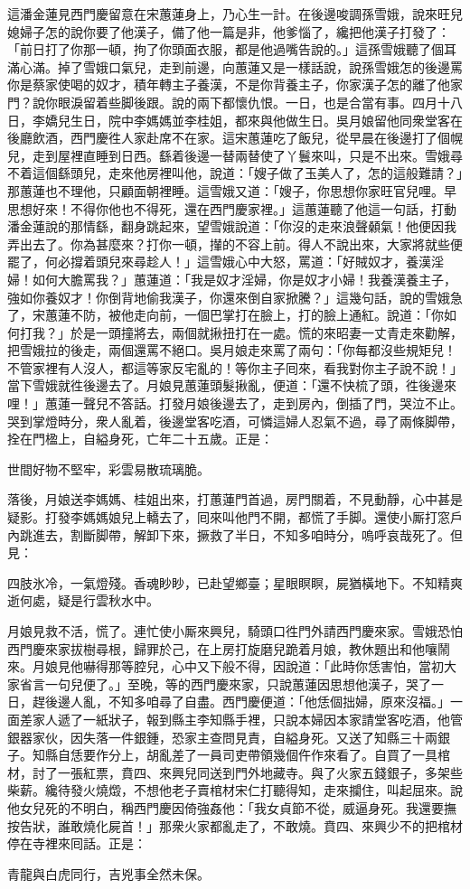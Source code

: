這潘金蓮見西門慶留意在宋蕙蓮身上，乃心生一計。在後邊唆調孫雪娥，說來旺兒媳婦子怎的說你要了他漢子，備了他一篇是非，他爹惱了，纔把他漢子打發了：「前日打了你那一頓，拘了你頭面衣服，都是他過嘴告說的。」這孫雪娥聽了個耳滿心滿。掉了雪娥口氣兒，走到前邊，向蕙蓮又是一樣話說，說孫雪娥怎的後邊罵你是蔡家使喝的奴才，積年轉主子養漢，不是你背養主子，你家漢子怎的離了他家門？說你眼淚留着些脚後跟。說的兩下都懷仇恨。一日，也是合當有事。四月十八日，李嬌兒生日，院中李媽媽並李桂姐，都來與他做生日。吳月娘留他同衆堂客在後廳飲酒，西門慶徃人家赴席不在家。這宋蕙蓮吃了飯兒，從早晨在後邊打了個幌兒，走到屋裡直睡到日西。繇着後邊一替兩替使了丫鬟來叫，只是不出來。雪娥尋不着這個繇頭兒，走來他房裡叫他，說道：「嫂子做了玉美人了，怎的這般難請？」那蕙蓮也不理他，只顧面朝裡睡。這雪娥又道：「嫂子，你思想你家旺官兒哩。早思想好來！不得你他也不得死，還在西門慶家裡。」{}這蕙蓮聽了他這一句話，打動潘金蓮說的那情繇，翻身跳起來，望雪娥說道：「你沒的走來浪聲顙氣！他便因我弄出去了。你為甚麼來？打你一頓，攆的不容上前。得人不說出來，大家將就些便罷了，何必撐着頭兒來尋趁人！」這雪娥心中大怒，罵道：「好賊奴才，養漢淫婦！如何大膽罵我？」蕙蓮道：「我是奴才淫婦，你是奴才小婦！我養漢養主子，強如你養奴才！{}你倒背地偷我漢子，你還來倒自家掀騰？」這幾句話，說的雪娥急了，宋蕙蓮不防，被他走向前，一個巴掌打在臉上，打的臉上通紅。說道：「你如何打我？」於是一頭撞將去，兩個就揪扭打在一處。慌的來昭妻一丈青走來勸解，把雪娥拉的後走，兩個還罵不絕口。吳月娘走來罵了兩句：「你每都沒些規矩兒！不管家裡有人沒人，都這等家反宅亂的！等你主子囘來，看我對你主子說不說！」當下雪娥就徃後邊去了。月娘見蕙蓮頭髮揪亂，便道：「還不快梳了頭，徃後邊來哩！」蕙蓮一聲兒不答話。打發月娘後邊去了，走到房內，倒插了門，哭泣不止。哭到掌燈時分，衆人亂着，後邊堂客吃酒，可憐這婦人忍氣不過，{}尋了兩條脚帶，拴在門楹上，自縊身死，亡年二十五歲。正是：

世間好物不堅牢，彩雲易散琉璃脆。

落後，月娘送李媽媽、桂姐出來，打蕙蓮門首過，房門關着，不見動靜，心中甚是疑影。打發李媽媽娘兒上轎去了，囘來叫他門不開，都慌了手脚。還使小厮打窓戶內跳進去，割斷脚帶，解卸下來，撅救了半日，不知多咱時分，嗚呼哀哉死了。但見：

四肢氷冷，一氣燈殘。香魂眇眇，已赴望鄉臺；星眼瞑瞑，屍猶橫地下。不知精爽逝何處，疑是行雲秋水中。

月娘見救不活，慌了。連忙使小厮來興兒，騎頭口徃門外請西門慶來家。雪娥恐怕西門慶來家拔樹尋根，歸罪於己，在上房打旋磨兒跪着月娘，教休題出和他嚷鬧來。月娘見他嚇得那等腔兒，心中又下般不得，因說道：「此時你恁害怕，當初大家省言一句兒便了。」至晚，等的西門慶來家，只說蕙蓮因思想他漢子，哭了一日，趕後邊人亂，不知多咱尋了自盡。西門慶便道：「他恁個拙婦，原來沒福。」{}一面差家人遞了一紙狀子，報到縣主李知縣手裡，只說本婦因本家請堂客吃酒，他管銀器家伙，因失落一件銀鍾，恐家主查問見責，自縊身死。又送了知縣三十兩銀子。知縣自恁要作分上，胡亂差了一員司吏帶領幾個仵作來看了。自買了一具棺材，討了一張紅票，賁四、來興兒同送到門外地藏寺。與了火家五錢銀子，多架些柴薪。纔待發火燒燬，不想他老子賣棺材宋仁打聽得知，走來攔住，叫起屈來。說他女兒死的不明白，稱西門慶因倚強姦他：「我女貞節不從，威逼身死。我還要撫按告狀，誰敢燒化屍首！」那衆火家都亂走了，不敢燒。賁四、來興少不的把棺材停在寺裡來囘話。正是：

青龍與白虎同行，吉兇事全然未保。

